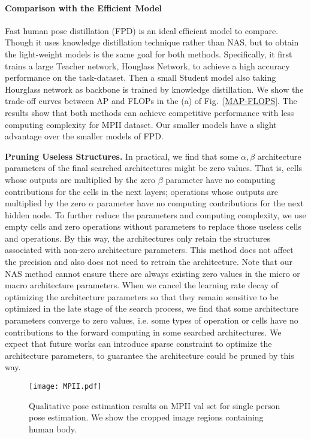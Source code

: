 \documentclass[journal]{IEEEtran}
\begin{document}
  \paragraph{Comparison with the Efficient Model}
  
  Fast human pose distillation (FPD) \cite{Zhang2018FastHP} is an ideal efficient model to compare. Though it uses knowledge distillation technique rather than NAS, but to obtain the light-weight models is the same goal for both methods. Specifically, it first trains a large Teacher network, Houglass Network, to achieve a high accuracy performance on the task-dataset. Then a small Student model also taking Hourglass network as backbone is trained by knowledge distillation. We show the trade-off curves between AP and FLOPs in the (a) of Fig.~\ref{MAP-FLOPS}. The results show that both methods can achieve competitive performance with less computing complexity for MPII dataset. Our smaller models have a slight advantage over the smaller models of FPD.

\label{prune}
\textbf{Pruning Useless Structures.} In practical, we find that some $\alpha, \beta$ architecture parameters of the final searched architectures might be zero values. That is, cells whose outputs are multiplied by the zero $\beta$ parameter have no computing contributions for the cells in the next layers; operations whose outputs are multiplied by the zero $\alpha$ parameter have no computing contributions for the next hidden node. To further reduce the parameters and computing complexity, we use empty cells and zero operations without parameters to replace those useless cells and operations. By this way, the architectures only retain the structures associated with non-zero architecture parameters. This method does not affect the precision and also does not need to retrain the architecture. Note that our NAS method cannot ensure there are always existing zero values in the micro or macro architecture parameters. When we cancel the learning rate decay of optimizing the architecture parameters so that they remain sensitive to be optimized in the late stage of the search process, we find that some architecture parameters converge to zero values, i.e. some types of operation or cells have no contributions to the forward computing in some searched architectures. We expect that future works can introduce sparse constraint to optimize the architecture parameters, to guarantee the architecture could be pruned by this way.

\begin{figure*}
	
	\centering
\texttt{[image: MPII.pdf]}
	\caption{Qualitative pose estimation results on MPII val set for single person pose estimation. We show the cropped image regions containing human body.
	}
	
	\label{mpii_results}
\end{figure*}
\end{document}
